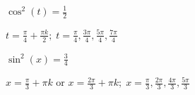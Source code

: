\documentclass{ximera}
\begin{document}
\begin{question}
\begin{problem}
$\cos^{2} \left( t \right) = \frac{1}{2}$

\begin{solution}
$t = \frac{\pi}{4} + \frac{\pi k}{2}; \; t = \frac{\pi}{4}, \frac{3\pi}{4}, \frac{5\pi}{4}, \frac{7\pi}{4}$
\end{solution}
\end{problem}

\begin{problem} \label{solvebasiclast}
$\sin^{2} \left( x \right) = \frac{3}{4}$ 

\begin{solution}
$x = \frac{\pi}{3} + \pi k$ or $x = \frac{2\pi}{3} + \pi k; \; x = \frac{\pi}{3}, \frac{2\pi}{3}, \frac{4\pi}{3}, \frac{5\pi}{3}$
\end{solution}
\end{problem}
\end{question}
\end{document}
